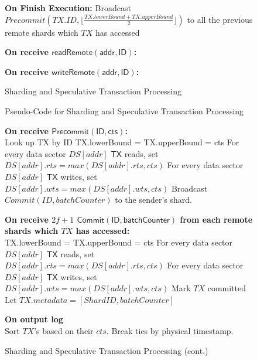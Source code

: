 \begin{figure*}
\begin{algorithm}[H]
\textbf{On Finish Execution:}
Broadcast $Precommit(TX.ID, \lfloor \frac{TX.lowerBound + TX.upperBound}{2}\rfloor)$ to all the previous remote shards  which $TX$ has accessed\;

\textbf{On receive $\mathsf{readRemote(addr, ID)}$:}\\

\textbf{On receive $\mathsf{writeRemote(addr, ID)}$:}\\

\caption{Sharding and Speculative Transaction Processing}
\label{alg:shard}
\end{algorithm}
\caption{Pseudo-Code for Sharding and Speculative Transaction Processing}
\end{figure*}

\begin{figure*}
\begin{algorithm}[H]
\textbf{On receive $\mathsf{Precommit(ID, cts)}$:}\\
Look up TX by ID\;
TX.lowerBound = TX.upperBound = cts\;
For every data sector $DS[addr]$ $\mathsf{TX}$ reads, set $DS[addr].rts = max(DS[addr].rts, cts)$\;
For every data sector $DS[addr]$ $\mathsf{TX}$ writes, set $DS[addr].wts = max(DS[addr].wts, cts)$\;
Broadcast $Commit(ID, batchCounter)$ to the sender's shard.\;

\textbf{On receive $2f+1$ $\mathsf{Commit(ID, batchCounter)}$ from each remote shards which $TX$ has accessed:}\\
TX.lowerBound = TX.upperBound = cts\;
For every data sector $DS[addr]$ $\mathsf{TX}$ reads, set $DS[addr].rts = max(DS[addr].rts, cts)$\;
For every data sector $DS[addr]$ $\mathsf{TX}$ writes, set $DS[addr].wts = max(DS[addr].wts, cts)$\;
Mark $TX$ committed\;
Let $TX.metadata = [ShardID, batchCounter]$\;

\textbf{On output log}\\
Sort $TX$'s based on their $cts$. Break ties by physical timestamp.

\caption{Sharding and Speculative Transaction Processing (cont.)}
\end{algorithm}
\end{figure*}

